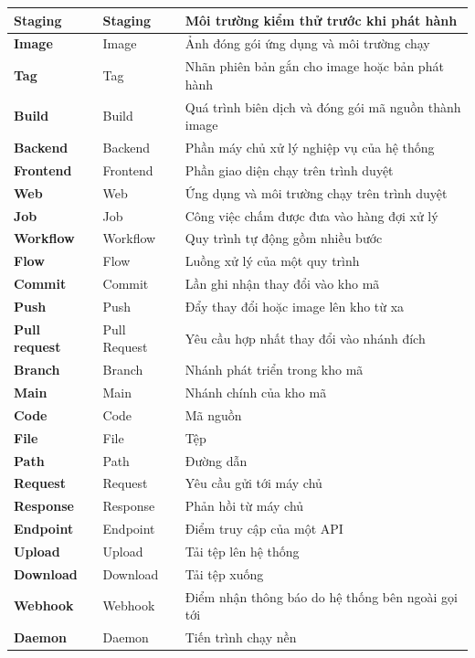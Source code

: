 \documentclass[../BTL.tex]{subfiles}
\begin{document}
\begin{longtable}{|p{3.2cm}|p{3.5cm}|p{7.1cm}|}
	\textbf{Staging} & Staging & Môi trường kiểm thử trước khi phát hành\\ \hline
	\textbf{Image} & Image & Ảnh đóng gói ứng dụng và môi trường chạy\\ \hline
	\textbf{Tag} & Tag & Nhãn phiên bản gắn cho image hoặc bản phát hành\\ \hline
	\textbf{Build} & Build & Quá trình biên dịch và đóng gói mã nguồn thành image\\ \hline
	\textbf{Backend} & Backend & Phần máy chủ xử lý nghiệp vụ của hệ thống\\ \hline
	\textbf{Frontend} & Frontend & Phần giao diện chạy trên trình duyệt\\ \hline
	\textbf{Web} & Web & Ứng dụng và môi trường chạy trên trình duyệt\\ \hline
	\textbf{Job} & Job & Công việc chấm được đưa vào hàng đợi xử lý\\ \hline
	\textbf{Workflow} & Workflow & Quy trình tự động gồm nhiều bước\\ \hline
	\textbf{Flow} & Flow & Luồng xử lý của một quy trình\\ \hline
	\textbf{Commit} & Commit & Lần ghi nhận thay đổi vào kho mã\\ \hline
	\textbf{Push} & Push & Đẩy thay đổi hoặc image lên kho từ xa\\ \hline
	\textbf{Pull request} & Pull Request & Yêu cầu hợp nhất thay đổi vào nhánh đích\\ \hline
	\textbf{Branch} & Branch & Nhánh phát triển trong kho mã\\ \hline
	\textbf{Main} & Main & Nhánh chính của kho mã\\ \hline
	\textbf{Code} & Code & Mã nguồn\\ \hline
	\textbf{File} & File & Tệp\\ \hline
	\textbf{Path} & Path & Đường dẫn\\ \hline
	\textbf{Request} & Request & Yêu cầu gửi tới máy chủ\\ \hline
	\textbf{Response} & Response & Phản hồi từ máy chủ\\ \hline
	\textbf{Endpoint} & Endpoint & Điểm truy cập của một API\\ \hline
	\textbf{Upload} & Upload & Tải tệp lên hệ thống\\ \hline
	\textbf{Download} & Download & Tải tệp xuống\\ \hline
	\textbf{Webhook} & Webhook & Điểm nhận thông báo do hệ thống bên ngoài gọi tới\\ \hline
	\textbf{Daemon} & Daemon & Tiến trình chạy nền\\ \hline

\end{longtable}
\end{document}
